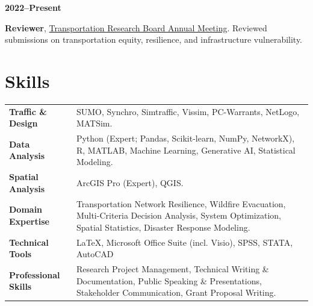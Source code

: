 \documentclass[a4paper,11pt]{article}
\begin{document}
\begin{justify}
\begin{flushleft}
\parbox[t]{2.5cm}{\textbf{2022--Present}}%
\hspace{0.1mm}%
\parbox[t]{\dimexpr\textwidth-2.5cm-0.1mm\relax}{%
\textbf{Reviewer}, \href{https://trb-annual-meeting.nationalacademies.org/}{Transportation Research Board Annual Meeting}. Reviewed submissions on transportation equity, resilience, and infrastructure vulnerability.}
\end{flushleft}
\end{justify}




\section{Skills}
\begin{tabularx}{\textwidth}{ p{3.5cm} X }
    \textbf{Traffic \& Design} & 
    SUMO, Synchro, Simtraffic, Vissim, PC-Warrants, NetLogo, MATSim. \\[2ex]

    \textbf{Data Analysis} & 
    Python (Expert; Pandas, Scikit-learn, NumPy, NetworkX), R, MATLAB, Machine Learning, Generative AI, Statistical Modeling. \\[4ex]
    
    \textbf{Spatial Analysis} & 
    ArcGIS Pro (Expert), QGIS. \\[2ex]

    \textbf{Domain Expertise} & 
    Transportation Network Resilience, Wildfire Evacuation, Multi-Criteria Decision Analysis, System Optimization, Spatial Statistics, Disaster Response Modeling. \\[2ex]

    \textbf{Technical Tools} & 
    LaTeX, Microsoft Office Suite (incl. Visio), SPSS, STATA, AutoCAD \\[2ex]

    \textbf{Professional Skills} & 
    Research Project Management, Technical Writing \& Documentation, Public Speaking \& Presentations, Stakeholder Communication, Grant Proposal Writing. \\
\end{tabularx}
\end{document}
